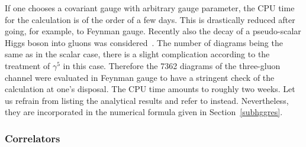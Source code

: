 If one chooses a covariant gauge with arbitrary gauge parameter, the CPU
time for the calculation is of the order of a few days.  This is
drastically reduced after going, for example, to Feynman gauge.
Recently also the decay of a pseudo-scalar Higgs boson into gluons was
considered~\cite{CheKniSteBar98}. The number of diagrams being the same
as in the scalar case, there is a slight complication according to the
treatment of $\gamma^5$ in this case. Therefore the 7362 diagrams of the
three-gluon channel were evaluated in Feynman gauge to have a stringent
check of the calculation at one's disposal. The CPU time amounts to
roughly two weeks.  Let us refrain from listing the
analytical results and refer to \cite{CheKniSte97hgg,CheKniSte98dec}
instead.  Nevertheless, they are incorporated in the numerical formula
given in Section~\ref{subhggres}.


\subsubsection{\label{subhggcol}Correlators}


